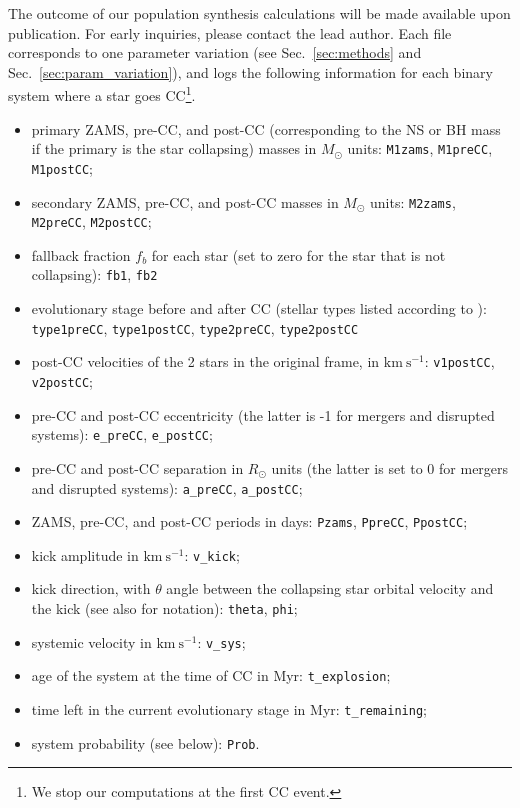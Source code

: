\documentclass{aa}
\newcommand{\todo}[1]{{\large $\blacksquare$~\textbf{\color{red}[#1]}}~$\blacksquare$}
\DeclareRobustCommand{\Secref}[1]{Sec.~\ref{#1}}
\begin{document}
The outcome of our population synthesis calculations will be made
available upon publication. For early inquiries, please contact the
lead author.
Each file corresponds to one parameter variation (see
\Secref{sec:methods} and \Secref{sec:param_variation}), and logs the
following information for each binary system where a star goes
CC\footnote{We stop our computations at the first CC event.}.
\begin{itemize}
 \item primary ZAMS, pre-CC, and post-CC (corresponding to the NS or
   BH mass if the primary is the star collapsing) masses in $M_\odot$ units:
   \texttt{M1zams}, \texttt{M1preCC}, \texttt{M1postCC};
 \item secondary ZAMS, pre-CC, and post-CC masses in $M_\odot$ units:
   \texttt{M2zams}, \texttt{M2preCC}, \texttt{M2postCC};
 \item fallback fraction $f_b$ for each star (set to zero for the star
   that is not collapsing):
   \texttt{fb1}, \texttt{fb2}
 \item evolutionary stage before and after CC (stellar types listed
   according to \citealt{hurley:00}):
   \texttt{type1preCC}, \texttt{type1postCC},
   \texttt{type2preCC}, \texttt{type2postCC}
 \item post-CC velocities of the 2 stars in the original frame, in
   $\mathrm{km\ s^{-1}}$: \texttt{v1postCC}, \texttt{v2postCC};
 \item pre-CC and post-CC eccentricity (the latter is -1 for mergers
   and disrupted systems): \texttt{e\_preCC}, \texttt{e\_postCC};
 \item pre-CC and post-CC separation in $R_\odot$ units (the latter
   is set to 0 for mergers and disrupted systems):
   \texttt{a\_preCC}, \texttt{a\_postCC};
 \item ZAMS, pre-CC, and post-CC periods in
   days: \texttt{Pzams}, \texttt{PpreCC}, \texttt{PpostCC};
 \item kick amplitude in $\mathrm{km\ s^{-1}}$: \texttt{v\_kick};
 \item kick direction, with $\theta$ angle between the collapsing star
   orbital velocity and the kick (see also  for notation):
   \texttt{theta}, \texttt{phi};
 \item systemic velocity in $\mathrm{km\ s^{-1}}$: \texttt{v\_sys};
 \item age of the system at the time of CC in Myr: \texttt{t\_explosion};
 \item time left in the current evolutionary stage in Myr:
   \texttt{t\_remaining};
 \item system probability (see below): \texttt{Prob}.
\end{itemize}
\end{document}
